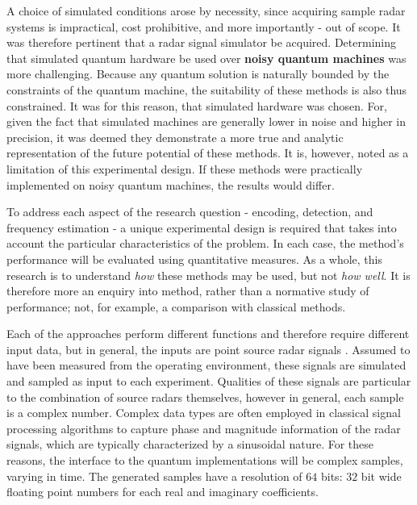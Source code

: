A choice of simulated conditions arose by necessity, since acquiring sample radar systems is impractical, cost prohibitive, and more importantly - out of scope.
It was therefore pertinent that a radar signal simulator be acquired.
Determining that simulated quantum hardware be used over \textbf{noisy quantum machines} was more challenging. 
Because any quantum solution is naturally bounded by the constraints of the quantum machine, the suitability of these methods is also thus constrained.
It was for this reason, that simulated hardware was chosen.
For, given the fact that simulated machines are generally lower in noise and higher in precision, it was deemed they demonstrate a more true and analytic representation of the future potential of these methods.
It is, however, noted as a limitation of this experimental design. If these methods were practically implemented on noisy quantum machines, the results would differ. 

To address each aspect of the research question - encoding, detection, and frequency estimation - a unique experimental design is required that takes into account the particular characteristics of the problem.
In each case, the method's performance will be evaluated using quantitative measures.
As a whole, this research is to understand \textit{how} these methods may be used, but not \textit{how well}.
It is therefore more an enquiry into method, rather than a normative study of performance; not, for example, a comparison with classical methods.

Each of the approaches perform different functions and therefore require different input data, but in general, the inputs are point source radar signals \cite{chakravorty_what_2018}.
Assumed to have been measured from the operating environment, these signals are simulated and sampled as input to each experiment.
Qualities of these signals are particular to the combination of source radars themselves, however in general, each sample is a complex number.
Complex data types are often employed in classical signal processing algorithms to capture phase and magnitude information of the radar signals, which are typically characterized by a sinusoidal nature.
For these reasons, the interface to the quantum implementations will be complex samples, varying in time.
The generated samples have a resolution of \(64\) bits: \(32\) bit wide floating point numbers for each real and imaginary coefficients.

